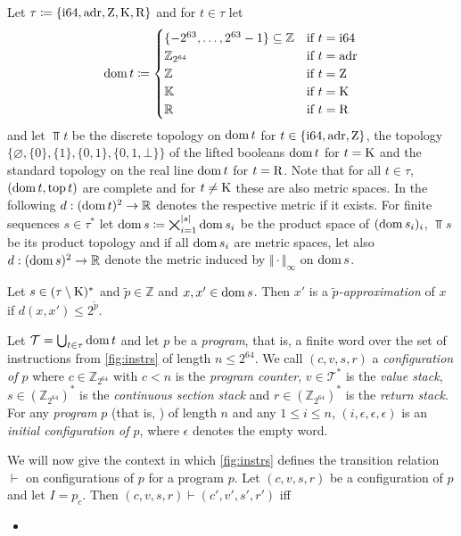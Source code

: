 \documentclass[a4paper,parskip=half]{scrartcl}
\begin{document}
Let $\tau\coloneqq\{\text{i64},\text{adr},\text Z,\text K,\text R\}$ and for
$t\in\tau$ let
\[ \operatorname{dom} t\coloneqq\begin{cases}
	\{-2^{63},\ldots,2^{63}-1\}\subseteq\mathbb Z &\text{if}~t=\text{i64} \\
	\mathbb Z_{2^{64}} &\text{if}~t=\text{adr} \\
	\mathbb Z &\text{if}~t=\text Z \\
	\mathbb K &\text{if}~t=\text K \\
	\mathbb R &\text{if}~t=\text R
\end{cases} \]
and let $\Top t$ be the discrete topology on $\operatorname{dom} t$ for $t\in\{\text{i64},\text{adr},\text Z\}$,
the topology $\{\varnothing,\{0\},\{1\},\{0,1\},\{0,1,\bot\}\}$ of the lifted
booleans $\operatorname{dom} t$ for $t=\text K$ and the standard topology on the real line
$\operatorname{dom} t$ for $t=\text R$. Note that for all $t\in\tau$, $(\operatorname{dom} t,\operatorname{top} t)$ are
complete and for $t\neq\text K$ these are also metric spaces. In the following
$d:(\operatorname{dom} t)^2\to\mathbb R$ denotes the respective metric if it exists.
For finite sequences $s\in\tau^*$ let
$\operatorname{dom} s\coloneqq\bigtimes_{i=1}^{|s|}\operatorname{dom} s_i$
be the product space of $(\operatorname{dom} s_i)_i$, $\Top s$ be its product topology and
if all $\operatorname{dom} s_i$ are metric spaces, let also $d:(\operatorname{dom} s)^2\to\mathbb R$ denote
the metric induced by $\Vert\cdot\Vert_\infty$ on $\operatorname{dom} s$.


Let $s\in(\tau\setminus\text K)^*$ and $\tilde p\in\mathbb Z$ and $x,x'\in\operatorname{dom} s$.
Then $x'$ is a \emph{$\tilde p$-approximation} of $x$ if
$d(x,x')\leq2^{\tilde p}$.

Let $\mathcal T=\bigcup_{t\in\tau}\operatorname{dom} t$ and let $p$ be a \emph{program}, that
is, a finite word over the set of
instructions from \cref{fig:instrs} of length $n\leq 2^{64}$.
We call $(c,v,s,r)$
a \emph{configuration of $p$} where $c\in\mathbb Z_{2^{64}}$ with $c<n$ is the
\emph{program counter}, $v\in\mathcal T^*$ is the
\emph{value stack}, $s\in(\mathbb Z_{2^{64}})^*$ is the \emph{continuous section
stack} and $r\in(\mathbb Z_{2^{64}})^*$ is the
\emph{return stack}.
For any \emph{program} $p$ (that is, ) of length $n$ and any $1\leq i\leq n$,
$(i,\epsilon,\epsilon,\epsilon)$ is an \emph{initial configuration of $p$},
where $\epsilon$ denotes the empty word.

We will now give the context in which \cref{fig:instrs} defines the transition
relation $\vdash$ on configurations of $p$ for a program $p$. Let $(c,v,s,r)$ be
a configuration of $p$ and let $I=p_c$.
Then $(c,v,s,r)\vdash(c',v',s',r')$ iff
\begin{itemize}
\item
\end{itemize}
\end{document}
